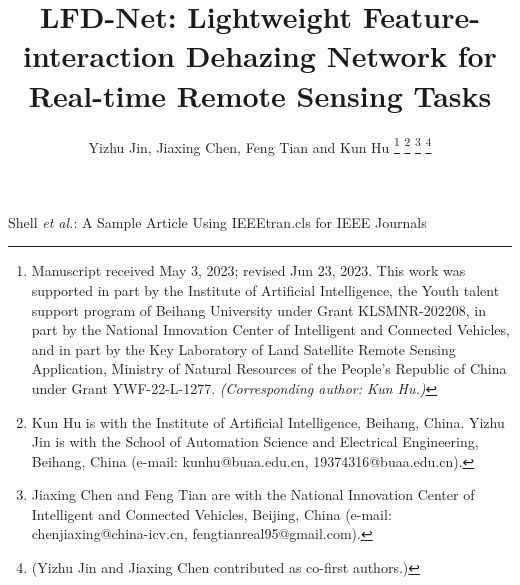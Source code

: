 \documentclass[lettersize,journal]{IEEEtran}
\begin{document}
\title{LFD-Net: Lightweight Feature-interaction Dehazing Network for Real-time Remote Sensing Tasks}
  
\author{
    Yizhu Jin, Jiaxing Chen, Feng Tian and Kun Hu  %
    \thanks{Manuscript received May 3, 2023; revised Jun 23, 2023. This work was supported in part by the Institute of Artificial Intelligence, the Youth talent support program of Beihang University under Grant KLSMNR-202208, in part by the National Innovation Center of Intelligent and Connected Vehicles, and in part by the Key Laboratory of Land Satellite Remote Sensing Application, Ministry of Natural Resources of the People's Republic of China under Grant YWF-22-L-1277. \textit{(Corresponding author: Kun Hu.)}}
    \thanks{Kun Hu is with the Institute of Artificial Intelligence, Beihang, China. Yizhu Jin is with the School of Automation Science and Electrical Engineering, Beihang, China (e-mail: kunhu@buaa.edu.cn, 19374316@buaa.edu.cn).}
    \thanks{Jiaxing Chen and Feng Tian are with the National Innovation Center of Intelligent and Connected Vehicles, Beijing, China (e-mail: chenjiaxing@china-icv.cn, fengtianreal95@gmail.com).}
    \thanks{(Yizhu Jin and Jiaxing Chen contributed as co-first authors.)}
}

%
{Shell \MakeLowercase{\textit{et al.}}: A Sample Article Using IEEEtran.cls for IEEE Journals}


\maketitle
\end{document}
